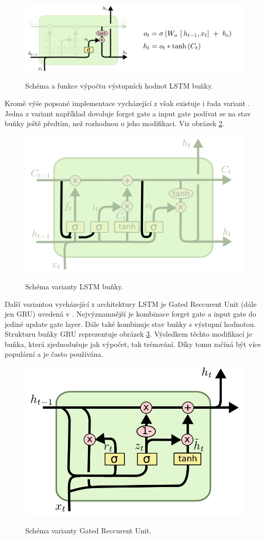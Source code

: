\begin{figure}[h]\centering
    \centering
    \includegraphics[width=0.8\linewidth]{obrazky/LSTM3-focus-o.png}\\[1pt]  
    \caption{Schéma a funkce výpočtu výstupních hodnot LSTM buňky. \cite{colah_lstm}}    
    \label{obrazekLSTMOutput}
\end{figure}

Kromě výše popsané implementace vycházející z \cite{HochSchm97} však existuje i řada variant \cite{cho-etal-2014-learning, Gers_schmidhuber}.
Jedna z variant například dovoluje forget gate a input gate
podívat se na stav buňky ještě předtím, 
než rozhodnou o jeho modifikaci\cite{Gers_schmidhuber}.
Viz obrázek \ref{obrazekLSTMPeepholes}.

\begin{figure}[h]\centering
    \centering
    \includegraphics[width=0.4\linewidth]{obrazky/LSTM3-var-peepholes.png}\\[1pt]  
    \caption{Schéma varianty LSTM buňky. \cite{colah_lstm}}    
    \label{obrazekLSTMPeepholes}
\end{figure}

Další variantou vycházející z architektury LSTM
je Gated Reccurent Unit (dále jen GRU) uvedená v
\cite{cho-etal-2014-learning}.
Nejvýznamnější je kombinace forget gate a input gate 
do jediné update gate layer.
Dále také kombinuje stav buňky s výstupní hodnotou.
Strukturu buňky GRU reprezentuje obrázek \ref{obrazekGRU}.
Výsledkem těchto modifikací je buňka,
která zjednodušuje jak výpočet, tak trénování.
Díky tomu začíná být více populární a je často používána.

\begin{figure}[h]\centering
    \centering
    \includegraphics[width=0.4\linewidth]{obrazky/LSTM3-var-GRU.png}\\[1pt]  
    \caption{Schéma varianty Gated Reccurent Unit. \cite{colah_lstm}}    
    \label{obrazekGRU}
\end{figure}

